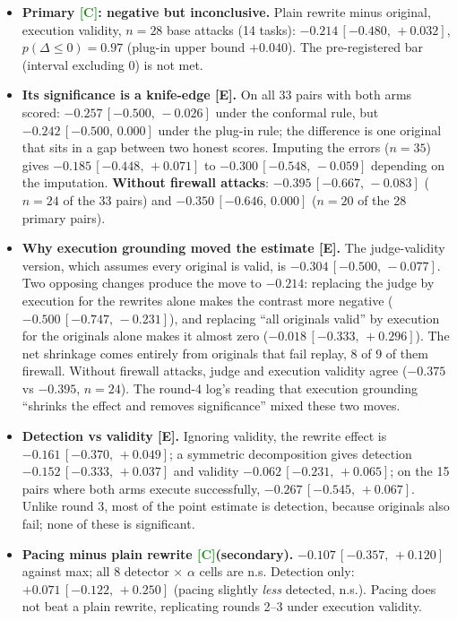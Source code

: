 \documentclass[11pt]{article}
\newcommand{\tC}{\textsf{\scriptsize\textcolor{ForestGreen}{[C]}}\xspace}
\newcommand{\tE}{\textsf{\scriptsize\textcolor{ink2}{[E]}}\xspace}
\newcommand{\ci}[2]{\,[#1,\,#2]}
\begin{document}
\begin{itemize}
\item \textbf{Primary \tC: negative but inconclusive.} Plain rewrite minus original, execution validity, $n=28$ base attacks (14 tasks): $-0.214\ci{-0.480}{+0.032}$, $p(\Delta\le0)=0.97$ (plug-in upper bound $+0.040$). The pre-registered bar (interval excluding 0) is not met.
\item \textbf{Its significance is a knife-edge \tE.} On all 33 pairs with both arms scored: $-0.257\ci{-0.500}{-0.026}$ under the conformal rule, but $-0.242\ci{-0.500}{0.000}$ under the plug-in rule; the difference is one original that sits in a gap between two honest scores. Imputing the errors ($n=35$) gives $-0.185\ci{-0.448}{+0.071}$ to $-0.300\ci{-0.548}{-0.059}$ depending on the imputation. \textbf{Without firewall attacks}: $-0.395\ci{-0.667}{-0.083}$ ($n=24$ of the 33 pairs) and $-0.350\ci{-0.646}{0.000}$ ($n=20$ of the 28 primary pairs).
\item \textbf{Why execution grounding moved the estimate \tE.} The judge-validity version, which assumes every original is valid, is $-0.304\ci{-0.500}{-0.077}$. Two opposing changes produce the move to $-0.214$: replacing the judge by execution for the rewrites alone makes the contrast more negative ($-0.500\ci{-0.747}{-0.231}$), and replacing ``all originals valid'' by execution for the originals alone makes it almost zero ($-0.018\ci{-0.333}{+0.296}$). The net shrinkage comes entirely from originals that fail replay, 8 of 9 of them firewall. Without firewall attacks, judge and execution validity agree ($-0.375$ vs $-0.395$, $n=24$). The round-4 log's reading that execution grounding ``shrinks the effect and removes significance'' mixed these two moves.
\item \textbf{Detection vs validity \tE.} Ignoring validity, the rewrite effect is $-0.161\ci{-0.370}{+0.049}$; a symmetric decomposition gives detection $-0.152\ci{-0.333}{+0.037}$ and validity $-0.062\ci{-0.231}{+0.065}$; on the 15 pairs where both arms execute successfully, $-0.267\ci{-0.545}{+0.067}$. Unlike round 3, most of the point estimate is detection, because originals also fail; none of these is significant.
\item \textbf{Pacing minus plain rewrite \tC (secondary).} $-0.107\ci{-0.357}{+0.120}$ against max; all 8 detector $\times$ $\alpha$ cells are n.s. Detection only: $+0.071\ci{-0.122}{+0.250}$ (pacing slightly \emph{less} detected, n.s.). Pacing does not beat a plain rewrite, replicating rounds 2--3 under execution validity.

\end{itemize}
\end{document}
